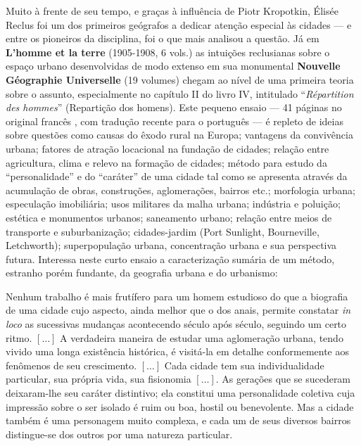 Muito à frente de seu tempo, e graças à influência de Piotr Kropotkin, Élisée Reclus foi um dos primeiros geógrafos a dedicar atenção especial às cidades --- e entre os pioneiros da disciplina, foi o que mais analisou a questão. Já em \textbf{L'homme et la terre} (1905-1908, 6 vols.) as intuições reclusianas sobre o espaço urbano desenvolvidas de modo extenso em sua monumental \textbf{Nouvelle Géographie Universelle} (19 volumes) chegam ao nível de uma primeira teoria sobre o assunto, especialmente no capítulo II do livro IV, intitulado ``\textit{Répartition des hommes}'' (Repartição dos homens). Este pequeno ensaio --- 41 páginas no original francês \cite[pp.~335-376]{RECLUS1905e}, com tradução recente para o português \cite{reclus_renovacao_2010} --- é repleto de ideias sobre questões como causas do êxodo rural na Europa; vantagens da convivência urbana; fatores de atração locacional na fundação de cidades; relação entre agricultura, clima e relevo na formação de cidades; método para estudo da ``personalidade'' e do ``caráter'' de uma cidade tal como se apresenta através da acumulação de obras, construções, aglomerações, bairros etc.; morfologia urbana; especulação imobiliária; usos militares da malha urbana; indústria e poluição; estética e monumentos urbanos; saneamento urbano; relação entre meios de transporte e suburbanização; cidades-jardim (Port Sunlight, Bourneville, Letchworth); superpopulação urbana, concentração urbana e sua perspectiva futura. Interessa neste curto ensaio a caracterização sumária de um método, estranho porém fundante, da geografia urbana e do urbanismo:

\begin{citacao}
Nenhum trabalho é mais frutífero para um homem estudioso do que a biografia de uma cidade cujo aspecto, ainda melhor que o dos anais, permite constatar \textit{in loco} as sucessivas mudanças acontecendo século após século, seguindo um certo ritmo. \([\dots]\) A verdadeira maneira de estudar uma aglomeração urbana, tendo vivido uma longa existência histórica, é visitá-la em detalhe conformemente aos fenômenos de seu crescimento. \([\dots]\) Cada cidade tem sua individualidade particular, sua própria vida, sua fisionomia \([\dots]\). As gerações que se sucederam deixaram-lhe seu caráter distintivo; ela constitui uma personalidade coletiva cuja impressão sobre o ser isolado é ruim ou boa, hostil ou benevolente. Mas a cidade também é uma personagem muito complexa, e cada um de seus diversos bairros distingue-se dos outros por uma natureza particular. \cite[pp.~51-53]{reclus_renovacao_2010}
\end{citacao}

